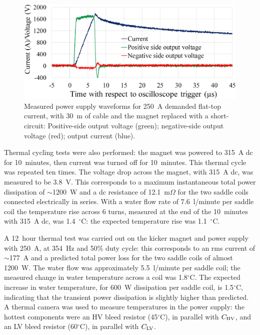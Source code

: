 \documentclass[aps,prab,twocolumn,superscriptaddress]{revtex4-1}
\begin{document}
\begin{figure}[h]
	\includegraphics[width=\linewidth]{short-circuit-current-250A-smaller.png} %
	\caption{Measured power supply waveforms for 250~A demanded flat-top current, with 30~m of cable and the magnet replaced with a short-circuit: Positive-side output voltage (green); negative-side output voltage (red); output current (blue).}
	\label{fig:shortcircuit}
\end{figure}

Thermal cycling tests were also performed: the magnet was powered to 315~A dc for 10~minutes, then current was turned off for 10~minutes. This thermal cycle was repeated ten times. The voltage drop across the magnet, with 315~A dc, was measured to be 3.8~V. This corresponds to a maximum instantaneous total power dissipation of $\sim$1200~W and a dc resistance of 12.1~m$\Omega$ for the two saddle coils connected electrically in series. With a water flow rate of 7.6~l/minute per saddle coil the temperature rise across 6 turns, measured at the end of the 10~minutes with 315~A dc, was 1.4~$^\circ$C: the expected temperature rise was 1.1~$^\circ$C.

A 12~hour thermal test was carried out on the kicker magnet and power supply with 250~A, at 354~Hz and 50\% duty cycle: this corresponds to an rms current of $\sim$177~A and a predicted total power loss for the two saddle coils of almost 1200~W. The water flow was approximately 5.5~l/minute per saddle coil; the measured change in water temperature across a coil was 1.8$^\circ$C. The expected increase in water temperature, for 600~W dissipation per saddle coil, is 1.5$^\circ$C, indicating that the transient power dissipation is slightly higher than predicted. A thermal camera was used to measure temperatures in the power supply: the hottest components were an HV bleed resistor (45$^\circ$C), in parallel with ${C_{\rm{HV}}}$, and an LV bleed resistor (60$^\circ$C), in parallel with ${C_{\rm{LV}}}$. 
\end{document}

